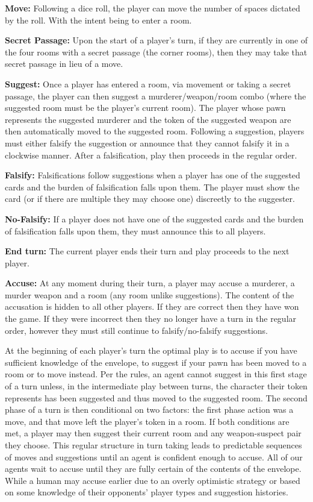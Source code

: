 \documentclass[msc, ai, logo, twoside, notimes, parskip, leftchapter, normalheadings]{infthesis}
\begin{document}
\begin{description}
\item \textbf{Move:} Following a dice roll, the player can move the number of spaces dictated by the roll. With the intent being to enter a room.
\item \textbf{Secret Passage:} Upon the start of a player's turn, if they are currently in one of the four rooms with a secret passage (the corner rooms), then they may take that secret passage in lieu of a move.
\item \textbf{Suggest:} Once a player has entered a room, via movement or taking a secret passage, the player can then suggest a murderer/weapon/room combo (where the suggested room must be the player's current room). The player whose pawn represents the suggested murderer and the token of the suggested weapon are then automatically moved to the suggested room. Following a suggestion, players must either falsify the suggestion or announce that they cannot falsify it in a clockwise manner. After a falsification, play then proceeds in the regular order.
\item \textbf{Falsify:} Falsifications follow suggestions when a player has one of the suggested cards and the burden of falsification falls upon them. The player must show the card (or if there are multiple they may choose one) discreetly to the suggester.
\item \textbf{No-Falsify:} If a player does not have one of the suggested cards and the burden of falsification falls upon them, they must announce this to all players.
\item \textbf{End turn:} The current player ends their turn and play proceeds to the next player.
\item \textbf{Accuse:} At any moment during their turn, a player may accuse a murderer, a murder weapon and a room (any room unlike suggestions). The content of the accusation is hidden to all other players. If they are correct then they have won the game. If they were incorrect then they no longer have a turn in the regular order, however they must still continue to falsify/no-falsify suggestions.
\end{description}

At the beginning of each player's turn the optimal play is to accuse if you have sufficient knowledge of the envelope, to suggest if your pawn has been moved to a room or to move instead. Per the rules, an agent cannot suggest in this first stage of a turn unless, in the intermediate play between turns, the character their token represents has been suggested and thus moved to the suggested room. The second phase of a turn is then conditional on two factors: the first phase action was a move, and that move left the player's token in a room. If both conditions are met, a player may then suggest their current room and any weapon-suspect pair they choose. This regular structure in turn taking leads to predictable sequences of moves and suggestions until an agent is confident enough to accuse. All of our agents wait to accuse until they are fully certain of the contents of the envelope. While a human may accuse earlier due to an overly optimistic strategy or based on some knowledge of their opponents' player types and suggestion histories. 
\end{document}
